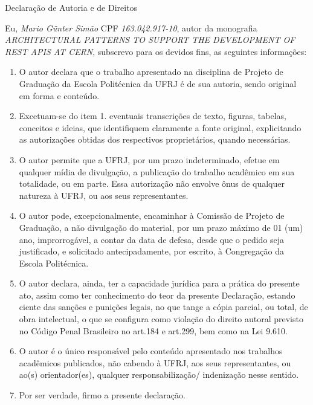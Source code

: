 {

\begin{center}
Declaração de Autoria e de Direitos
\end{center}

\vspace{0.5cm}

Eu, \emph{Mario Günter Simão} CPF \emph{163.042.917-10}, autor da monografia \emph{\MakeUppercase{Architectural Patterns to Support the Development of REST APIs at CERN}}, subscrevo para os devidos fins, as seguintes informações:

\begin{enumerate}
  \item O autor declara que o trabalho apresentado na disciplina de Projeto de Graduação da Escola Politécnica da UFRJ é de sua autoria, sendo original em forma e conteúdo.
  \item Excetuam-se do item 1. eventuais transcrições de texto, figuras, tabelas, conceitos e ideias, que identifiquem claramente a fonte original, explicitando as autorizações obtidas dos respectivos proprietários, quando necessárias.
  \item O autor permite que a UFRJ, por um prazo indeterminado, efetue em qualquer mídia de divulgação, a publicação do trabalho acadêmico em sua totalidade, ou em parte. Essa autorização não envolve ônus de qualquer natureza à UFRJ, ou aos seus representantes.
  \item O autor pode, excepcionalmente, encaminhar à Comissão de Projeto de Graduação, a não divulgação do material, por um prazo máximo de 01 (um) ano, improrrogável, a contar da data de defesa, desde que o pedido seja justificado, e solicitado antecipadamente, por escrito, à Congregação da Escola Politécnica.
  \item O autor declara, ainda, ter a capacidade jurídica para a prática do presente ato, assim como ter conhecimento do teor da presente Declaração, estando ciente das sanções e punições legais, no que tange a cópia parcial, ou total, de obra intelectual, o que se configura como violação do direito autoral previsto no Código Penal Brasileiro no art.184 e art.299, bem como na Lei 9.610.
  \item O autor é o único responsável pelo conteúdo apresentado nos trabalhos acadêmicos publicados, não cabendo à UFRJ, aos seus representantes,  ou ao(s) orientador(es), qualquer responsabilização/ indenização nesse sentido.
  \item Por ser verdade, firmo a presente declaração.
\end{enumerate}

}
